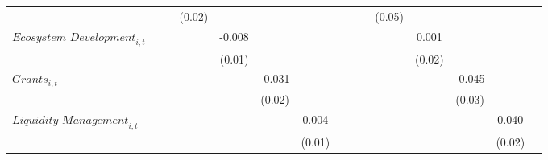 {\begin{tabular}{l*{14}{c}}
                    &                     &                     &      (0.02)         &                     &                     &                     &                     &                     &                     &      (0.05)         &                     &                     &                     &                     \\
$\textit{Ecosystem Development}_{i,t}$&                     &                     &                     &      -0.008         &                     &                     &                     &                     &                     &                     &       0.001         &                     &                     &                     \\
                    &                     &                     &                     &      (0.01)         &                     &                     &                     &                     &                     &                     &      (0.02)         &                     &                     &                     \\
$\textit{Grants}_{i,t}$&                     &                     &                     &                     &      -0.031         &                     &                     &                     &                     &                     &                     &      -0.045         &                     &                     \\
                    &                     &                     &                     &                     &      (0.02)         &                     &                     &                     &                     &                     &                     &      (0.03)         &                     &                     \\
$\textit{Liquidity Management}_{i,t}$&                     &                     &                     &                     &                     &       0.004         &                     &                     &                     &                     &                     &                     &       0.040\sym{*}  &                     \\
                    &                     &                     &                     &                     &                     &      (0.01)         &                     &                     &                     &                     &                     &                     &      (0.02)         &                     \\

\end{tabular}}
